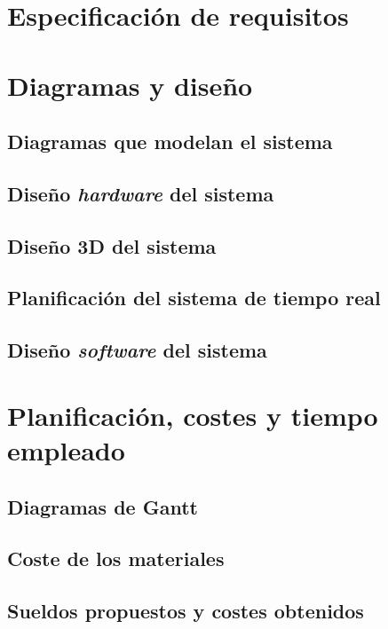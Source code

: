 \chapter{Especificación de requisitos}\label{chap:requirements}


\chapter{Diagramas y diseño}\label{chap:design}

\section{Diagramas que modelan el sistema}\label{sec:sys-diagrams}

\section{Diseño \textit{hardware} del sistema}\label{sec:hardware-design}
\section{Diseño 3D del sistema}\label{sec:3d-design}
\section{Planificación del sistema de tiempo real}\label{sec:rt-design}
\section{Diseño \textit{software} del sistema}\label{sec:software-design}

\chapter{Planificación, costes y tiempo empleado}\label{chap:planification}
\section{Diagramas de Gantt}
\section{Coste de los materiales}
\section{Sueldos propuestos y costes obtenidos}
